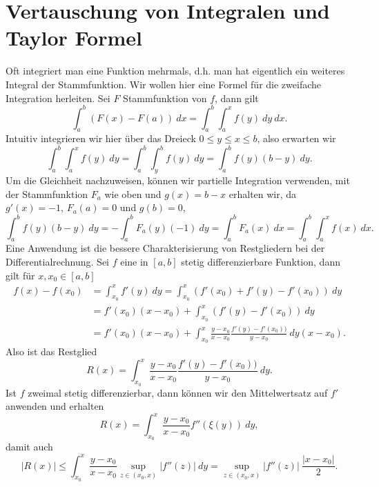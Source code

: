 \documentclass[letterpaper,10pt,english]{jupyterBook}
\begin{document}
\section{Vertauschung von Integralen und Taylor Formel}
\label{\detokenize{integration/vertauschen:vertauschung-von-integralen-und-taylor-formel}}\label{\detokenize{integration/vertauschen::doc}}
Oft integriert man eine Funktion mehrmals, d.h. man hat eigentlich ein weiteres Integral der Stammfunktion. Wir wollen hier eine Formel für die zweifache Integration herleiten. Sei \(F\) Stammfunktion von \(f\), dann gilt
\begin{equation*}
 \int_a^b (F(x) - F(a))~dx = \int_a^b \int_a^x f(y)~dy~dx.
\end{equation*}
Intuitiv integrieren wir hier über das Dreieck \(0 \leq y \leq x \leq b\), also erwarten wir
\begin{equation*}
 \int_a^b \int_a^x f(y)~dy = \int_a^b \int_y^b f(y)~dy = \int_a^b f(y) (b-y)~dy.
\end{equation*}
Um die Gleichheit nachzuweisen, können wir partielle Integration verwenden, mit der Stammfunktion \(F_a\) wie oben und \(g(x) = b-x\) erhalten wir, da \(g'(x)=-1\), \(F_a(a) = 0 \) und \(g(b) =0\),
\begin{equation*}
 \int_a^b f(y) (b-y)~dy = - \int_a^b F_a(y) (-1)~dy = \int_a^b F_a(x)~dx =  \int_a^b \int_a^x f(x)~dx .
\end{equation*}
Eine Anwendung ist die bessere Charakterisierung von Restgliedern bei der Differentialrechnung. Sei \(f\) eine in \([a,b]\) stetig differenzierbare Funktion, dann gilt für \(x,x_0 \in [a,b]\)
\begin{align*}
f(x) - f(x_0) &= \int_{x_0}^x f'(y)~dy =  \int_{x_0}^x (f'(x_0) + f'(y) -f'(x_0))~dy \\
&= f'(x_0) (x-x_0) + \int_{x_0}^x ( f'(y) -f'(x_0))~dy \\&= f'(x_0) (x-x_0) + \int_{x_0}^x \frac{y-x_0}{x-x_0} \frac{ f'(y) -f'(x_0))}{y-x_0}~dy  (x-x_0) .
\end{align*}
Also ist das Restglied
\begin{equation*}
R(x) = \int_{x_0}^x \frac{y-x_0}{x-x_0} \frac{ f'(y) -f'(x_0))}{y-x_0}~dy .
\end{equation*}
Ist \(f\) zweimal stetig differenzierbar, dann können wir den Mittelwertsatz auf \(f'\) anwenden und erhalten
\begin{equation*}
 R(x) = \int_{x_0}^x \frac{y-x_0}{x-x_0} f''(\xi(y))~dy,
\end{equation*}
damit auch
\begin{equation*}
 |R(x)| \leq  \int_{x_0}^x \frac{y-x_0}{x-x_0} \sup_{z \in (x_0,x)} |f''(z)|~dy = \sup_{z \in (x_0,x)} |f''(z)| ~ \frac{|x-x_0|}2.
\end{equation*}





\renewcommand{\indexname}{Proof Index}


\renewcommand{\indexname}{Index}
\end{document}
